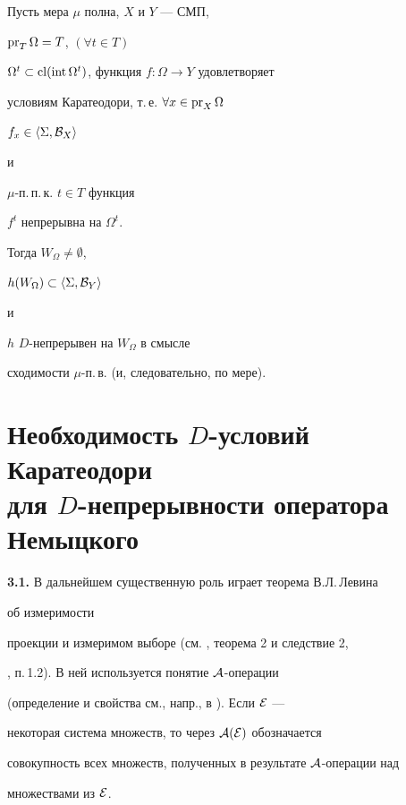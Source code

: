 \begin{cors} Пусть мера $\mu$ полна, $X$ и $Y$ --- СМП,


$\operatorname{pr}_T\Omega=T$, \; $(\forall t\in T)$ \;


$\Omega^t\subset\operatorname{cl}(\operatorname{int}\Omega^t)$, функция $f:\Omega\to Y$ удовлетворяет


условиям Каратеодори, т.\,е. $\forall x\in\operatorname{pr}_X\Omega$\;


$f_x\in\langle \Sigma,{\cal B}_X\rangle $


и


$\mu$-п.\,п.\,к. $t\in T$ функция


$f^t$ непрерывна на $\Omega^t$.





Тогда $W_\Omega\ne\emptyset$,


$h(W_\Omega)\subset\langle \Sigma,{\cal B}_Y\rangle $


и


$h$ \; $D$-непрерывен на $W_\Omega$ в смысле


сходимости $\mu$-п.\,в. (и, следовательно, по мере).


\end{cors}





\section{Необходимость $D$-условий Каратеодори\protect\\


для $D$-непрерывности оператора Немыцкого}





{\bf 3.1.} В дальнейшем существенную роль играет теорема В.Л.\,Левина


об измеримости


проекции и измеримом выборе (см. \cite{Lev1}, теорема 2 и следствие 2,


\cite{Lev2}, п.\,1.2). В ней используется понятие ${\cal A}$-операции


(определение и свойства см., напр., в \cite{Kur}). Если ${\cal E}$ ---


некоторая система множеств, то через ${\cal A}({\cal E})$ обозначается


совокупность всех множеств, полученных в результате ${\cal A}$-операции над


множествами из ${\cal E}$.





